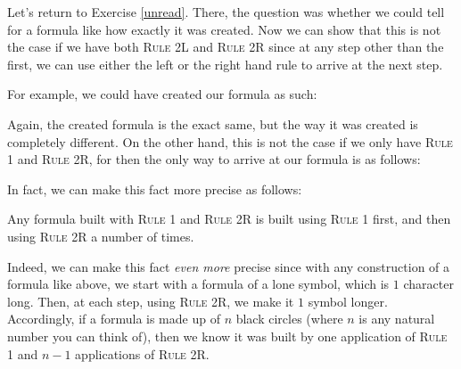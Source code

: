 Let's return to Exercise \ref{unread}. There, the question was whether we could tell for a formula like \bcirc\bcirc\bcirc\bcirc{} how exactly it was created. Now we can show that this is not the case if we have both \textsc{Rule 2L} and \textsc{Rule 2R} since at any step other than the first, we can use either the left or the right hand rule to arrive at the next step.

For example, we could have created our formula as such:

\medskip
\begin{axiomatic}
\end{axiomatic}
\medskip

Again, the created formula is the exact same, but the way it was created is completely different. On the other hand, this is not the case if we only have \textsc{Rule 1} and \textsc{Rule 2R}, for then the only way to arrive at our formula is as follows: 

\medskip
\begin{axiomatic}
\end{axiomatic}
\medskip

In fact, we can make this fact more precise as follows:

\begin{prop}
Any formula built with \textsc{Rule 1} and \textsc{Rule 2R} is built using \textsc{Rule 1} first, and then using \textsc{Rule 2R} a number of times. 
\end{prop}

Indeed, we can make this fact \textit{even more} precise since with any construction of a formula like above, we start with a formula of a lone symbol, which is $1$ character long. Then, at each step, using \textsc{Rule 2R}, we make it $1$ symbol longer. Accordingly, if a formula is made up of $n$ black circles (where $n$ is any natural number you can think of), then we know it was built by one application of \textsc{Rule 1} and $n-1$ applications of \textsc{Rule 2R}.


